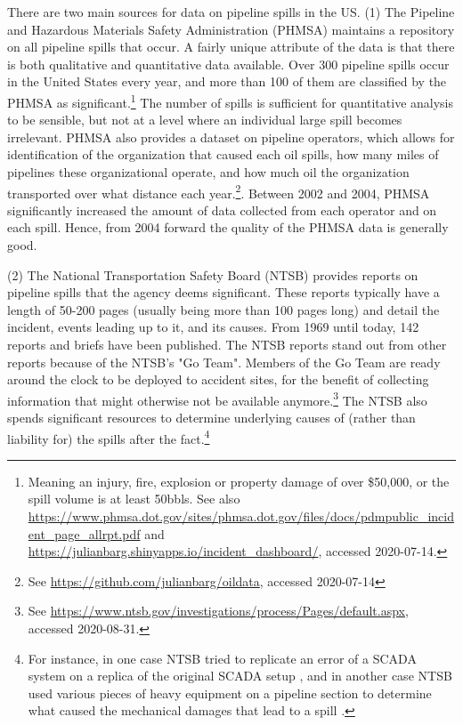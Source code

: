 There are two main sources for data on pipeline spills in the US. (1) The Pipeline and Hazardous Materials Safety Administration (PHMSA) maintains a repository on all pipeline spills that occur. A fairly unique attribute of the data is that there is both qualitative and quantitative data available. Over 300 pipeline spills occur in the United States every year, and more than 100 of them are classified by the PHMSA as significant.\footnote{Meaning an injury, fire, explosion or property damage of over \$50,000, or the spill volume is at least 50bbls. See also \url{https://www.phmsa.dot.gov/sites/phmsa.dot.gov/files/docs/pdmpublic_incident_page_allrpt.pdf} and \url{https://julianbarg.shinyapps.io/incident_dashboard/}, accessed 2020-07-14.} The number of spills is sufficient for quantitative analysis to be sensible, but not at a level where an individual large spill becomes irrelevant. PHMSA also provides a dataset on pipeline operators, which allows for identification of the organization that caused each oil spills, how many miles of pipelines these organizational operate, and how much oil the organization transported over what distance each year.\footnote{See \url{https://github.com/julianbarg/oildata}, accessed 2020-07-14}. Between 2002 and 2004, PHMSA significantly increased the amount of data collected from each operator and on each spill. Hence, from 2004 forward the quality of the PHMSA data is generally good.

(2) The National Transportation Safety Board (NTSB) provides reports on pipeline spills that the agency deems significant. These reports typically have a length of 50-200 pages (usually being more than 100 pages long) and detail the incident, events leading up to it, and its causes. From 1969 until today, 142 reports and briefs have been published. The NTSB reports stand out from other reports because of the NTSB's "Go Team". Members of the Go Team are ready around the clock to be deployed to accident sites, for the benefit of collecting information that might otherwise not be available anymore.\footnote{See \url{https://www.ntsb.gov/investigations/process/Pages/default.aspx}, accessed 2020-08-31.} The NTSB also spends significant resources to determine underlying causes of (rather than liability for) the spills after the fact.\footnote{For instance, in one case NTSB tried to replicate an error of a SCADA system on a replica of the original SCADA setup \citep{NTSB2002}, and in another case NTSB used various pieces of heavy equipment on a pipeline section to determine what caused the mechanical damages that lead to a spill \citep{NTSB1990}.}

